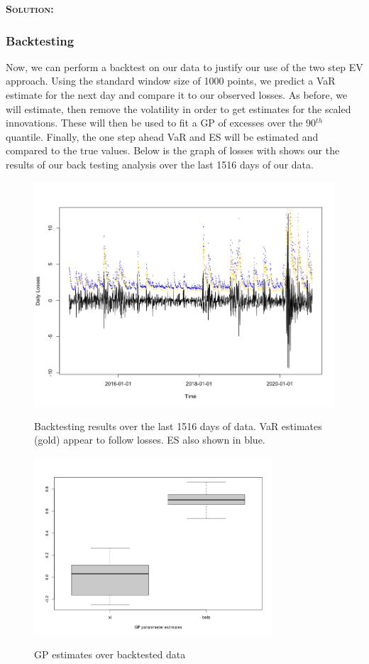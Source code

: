 \documentclass[12pt,oneside]{article}
\newenvironment{solution}
    {\textbf{\textsc{Solution:}}\\}
    {\newpage}
\begin{document}
\begin{solution}
\subsubsection*{Backtesting}
Now, we can perform a backtest on our data to justify our use of the two step EV approach. Using the standard window size of 1000 points, we predict a VaR estimate for the next day and compare it to our observed losses. As before, we will estimate, then remove the volatility in order to get estimates for the scaled innovations. These will then be used to fit a GP of excesses over the 90$^{th}$ quantile. Finally, the one step ahead VaR and ES will be estimated and compared to the true values. Below is the graph of losses with shows our the results of our back testing analysis over the last 1516 days of our data.
\begin{figure}[H]
\begin{center}
{\includegraphics[width=4.5in]{Assignments/a4/backtest-day.png}}
\caption{Backtesting results over the last 1516 days of data. VaR estimates (gold) appear to follow losses. ES also shown in blue.}

{\includegraphics[width=3.5in]{Assignments/a4/back-box.png}}
\caption{GP estimates over backtested data}
\end{center}
\end{figure}


\end{solution}
\end{document}
